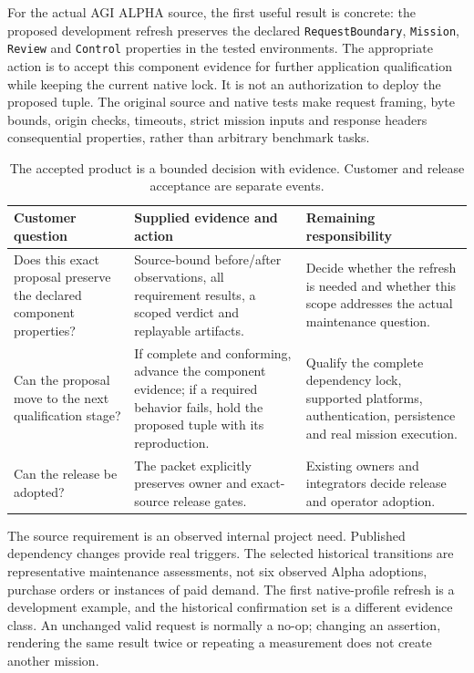 \documentclass[11pt,a4paper]{article}
\newcommand{\Alpha}{AGI ALPHA}
\begin{document}
For the actual \Alpha{} source, the first useful result is concrete: the proposed development refresh preserves the declared \texttt{RequestBoundary}, \texttt{Mission}, \texttt{Review} and \texttt{Control} properties in the tested environments. The appropriate action is to accept this component evidence for further application qualification while keeping the current native lock. It is not an authorization to deploy the proposed tuple. The original source and native tests make request framing, byte bounds, origin checks, timeouts, strict mission inputs and response headers consequential properties, rather than arbitrary benchmark tasks.\cite{consumer,contract,firstdelivery}

\begin{table}[htbp]
\centering\small
\begin{tabularx}{\textwidth}{@{}p{}YY@{}}
\toprule
Customer question & Supplied evidence and action & Remaining responsibility \\
\midrule
Does this exact proposal preserve the declared component properties? & Source-bound before/after observations, all requirement results, a scoped verdict and replayable artifacts. & Decide whether the refresh is needed and whether this scope addresses the actual maintenance question. \\
Can the proposal move to the next qualification stage? & If complete and conforming, advance the component evidence; if a required behavior fails, hold the proposed tuple with its reproduction. & Qualify the complete dependency lock, supported platforms, authentication, persistence and real mission execution. \\
Can the release be adopted? & The packet explicitly preserves owner and exact-source release gates. & Existing owners and integrators decide release and operator adoption. \\
\bottomrule
\end{tabularx}
\caption{The accepted product is a bounded decision with evidence. Customer and release acceptance are separate events.}
\label{tab:offering}
\end{table}

The source requirement is an observed internal project need. Published dependency changes provide real triggers. The selected historical transitions are representative maintenance assessments, not six observed Alpha adoptions, purchase orders or instances of paid demand. The first native-profile refresh is a development example, and the historical confirmation set is a different evidence class. An unchanged valid request is normally a no-op; changing an assertion, rendering the same result twice or repeating a measurement does not create another mission.\cite{selection,protocol}
\end{document}
